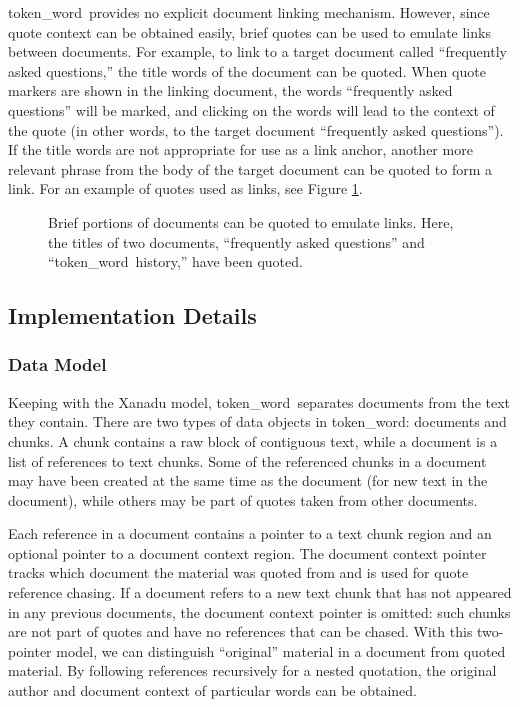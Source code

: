 \documentclass{acm_proc_article-sp}
\newcommand{\tokenWord}{token\_word}
\begin{document}
\tokenWord \  provides no explicit document linking mechanism.
However, since quote context can be obtained easily, brief quotes can be used to emulate links between documents.
For example, to link to a target document called ``frequently asked questions,'' the title words of the document can be quoted.
When quote markers are shown in the linking document, the words ``frequently asked questions'' will be marked, and clicking on the words will lead to the context of the quote (in other words, to the target document ``frequently asked questions'').
If the title words are not appropriate for use as a link anchor, another more relevant phrase from the body of the target document can be quoted to form a link.
For an example of quotes used as links, see Figure \ref{fig:quotesAsLinks}.

\begin{figure}[t]
\centering
{}
\caption{Brief portions of documents can be quoted to emulate links.  Here, the titles of two documents, ``frequently asked questions'' and ``\tokenWord \  history,'' have been quoted.}
\label{fig:quotesAsLinks}
\end{figure}

\subsection{Implementation Details}

\subsubsection{Data Model}
Keeping with the Xanadu model, \tokenWord \  separates documents from the text they contain.
There are two types of data objects in \tokenWord:  documents and chunks.
A chunk contains a raw block of contiguous text, while a document is a list of references to text chunks.
Some of the referenced chunks in a document may have been created at the same time as the document (for new text in the document), while others may be part of quotes taken from other documents.

Each reference in a document contains a pointer to a text chunk region and an optional pointer to a document context region.
The document context pointer tracks which document the material was quoted from and is used for quote reference chasing.
If a document refers to a new text chunk that has not appeared in any previous documents, the document context pointer is omitted:  such chunks are not part of quotes and have no references that can be chased.
With this two-pointer model, we can distinguish ``original'' material in a document from quoted material.  %
By following references recursively for a nested quotation, the original author and document context of particular words can be obtained.
\end{document}
